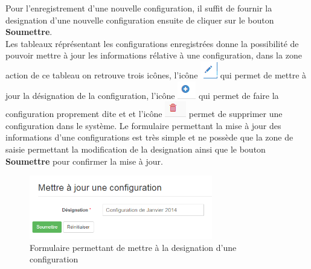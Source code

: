 \documentclass[12pt,a4paper]{report}
\begin{document}
\newpage
Pour l'enregistrement d'une nouvelle configuration, il suffit de fournir la designation d'une nouvelle configuration ensuite de cliquer sur le bouton \textbf{Soumettre}.
\\

Les tableaux réprésentant les configurations enregistrées donne la possibilité de pouvoir mettre à jour les informations rélative à une configuration, dans la zone action de ce tableau on retrouve trois icônes, l'icône \includegraphics[scale=0.7]{pic/EditUser.png} qui permet de mettre à jour la désignation de la configuration, l'icône  \includegraphics[scale=0.7]{pic/PlusConfigBlue.png} qui permet de faire la configuration proprement dite et  et l'icône  \includegraphics[scale=0.7]{pic/DeleteWRed.png} permet de supprimer une configuration dans le système.
Le formulaire permettant la mise à jour des informations d'une configurations est très simple et ne possède que la zone de saisie permettant la modification de la designation ainsi que le bouton \textbf{Soumettre} pour confirmer la mise à jour.

\begin{figure}[h]
\begin{center}
\includegraphics[width=8cm]{pic/UpDConfgTax.png}
\end{center}
\caption{Formulaire permettant de mettre à la designation d'une configuration}
\label{Formulaire permettant de mettre à la designation d'une configuration}
\end{figure} 
\end{document}
